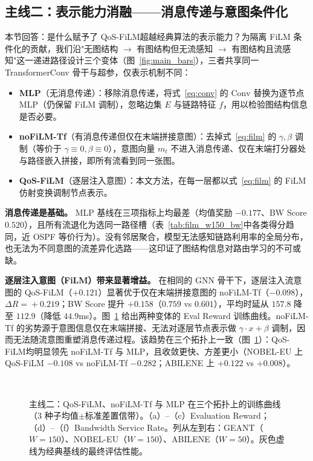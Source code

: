 \subsection{主线二：表示能力消融——消息传递与意图条件化}
\label{sec:exp:repr}

本节回答：是什么赋予了 QoS-FiLM超越经典算法的表示能力？为隔离 FiLM 条件化的贡献，我们沿"无图结构 $\to$ 有图结构但无流感知 $\to$ 有图结构且流感知"这一递进路径设计三个变体（图~\ref{fig:main_bars}），三者共享同一 TransformerConv 骨干与超参，仅表示机制不同：
\begin{itemize}
\item \textbf{MLP}（无消息传递）：移除消息传递，将式~\eqref{eq:conv} 的 $\mathrm{Conv}$ 替换为逐节点 MLP（仍保留 FiLM 调制），忽略边集 $E$ 与链路特征 $f$，用以检验图结构信息是否必要。
\item \textbf{noFiLM-Tf}（有消息传递但仅在末端拼接意图）：去掉式~\eqref{eq:film} 的 $\gamma,\beta$ 调制（等价于 $\gamma\equiv 0,\beta\equiv 0$），意图向量 $m_t$ 不进入消息传递、仅在末端打分器处与路径嵌入拼接，即所有流看到同一张图。
\item \textbf{QoS-FiLM}（逐层注入意图）：本文方法，在每一层都以式~\eqref{eq:film} 的 FiLM 仿射变换调制节点表示。
\end{itemize}

\textbf{消息传递是基础。} MLP 基线在三项指标上均最差（均值奖励 $-0.177$、BW Score $0.520$），且所有流退化为选同一路径槽（表~\ref{tab:film_w150_bw}中各类得分趋同，近 OSPF 等价行为）。没有邻居聚合，模型无法感知链路利用率的全局分布，也无法为不同意图的流差异化选路——这印证了图结构信息对路由学习的不可或缺。

\textbf{逐层注入意图（FiLM）带来显著增益。} 在相同的 GNN 骨干下，逐层注入流意图的 QoS-FiLM（$+0.121$）显著优于仅在末端拼接意图的 noFiLM-Tf（$-0.098$），$\Delta R\!=\!+0.219$；BW Score 提升 $+0.158$（$0.759$ vs $0.601$），平均时延从 $157.8$ 降至 $112.9$（降低 $44.9$ms）。图~\ref{fig:repr_training} 给出两种变体的 Eval Reward 训练曲线。noFiLM-Tf 的劣势源于意图信息仅在末端拼接、无法对逐层节点表示做 $\gamma\!\cdot\! x+\beta$ 调制，因而无法随流意图重塑消息传递过程。该趋势在三个拓扑上一致（图~\ref{fig:repr_training}）：QoS-FiLM均明显领先 noFiLM-Tf 与 MLP，且收敛更快、方差更小（NOBEL-EU 上 QoS-FiLM $-0.108$ vs noFiLM-Tf $-0.282$；ABILENE 上 $+0.122$ vs $+0.008$）。

\begin{figure}[t]
\centering
{}\hfill
{}\hfill
{}\\[4pt]
\hfill
{}\hfill
{}
\caption{主线二：QoS-FiLM、noFiLM-Tf 与 MLP 在三个拓扑上的训练曲线（3 种子均值$\pm$标准差置信带）。（a）--（c）Evaluation Reward；（d）--（f）Bandwidth Service Rate。列从左到右：GEANT（$W\!=\!150$）、NOBEL-EU（$W\!=\!150$）、ABILENE（$W\!=\!50$）。灰色虚线为经典基线的最终评估性能。}
\label{fig:repr_training}
\end{figure}

